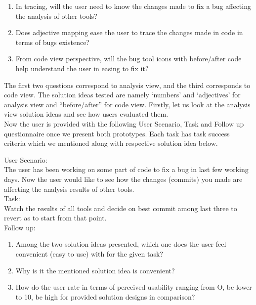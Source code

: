 \begin{enumerate}
\item In tracing, will the user need to know the changes made to fix a bug affecting the analysis of other tools?
\item Does adjective mapping ease the user to trace the changes made in code in terms of bugs existence?
\item From code view perspective, will the bug tool icons with before/after code help understand the user in easing to fix it?
\end{enumerate}

The first two questions correspond to analysis view, and the third corresponds to code view. The solution ideas tested are namely ‘numbers’ and ‘adjectives’ for analysis view and “before/after” for code view. Firstly, let us look at the analysis view solution ideas and see how users evaluated them. \\

Now the user is provided with the following User Scenario, Task and Follow up questionnaire once we present both prototypes. Each task has task success criteria which we mentioned along with respective solution idea below. \\

\clearpage

User Scenario: \\

The user has been working on some part of code to fix a bug in last few working days. Now the user would like to see how the changes (commits) you made are affecting the analysis results of other tools. \\

Task: \\

Watch the results of all tools and decide on best commit among last three to revert as to start from that point. \\

Follow up: \\

\begin{enumerate}
\item Among the two solution ideas presented, which one does the user feel convenient (easy to use) with for the given task?
\item Why is it the mentioned solution idea is convenient?
\item How do the user rate in terms of perceived usability ranging from O, be lower to 10, be high for provided solution designs in comparison?
\end{enumerate}

